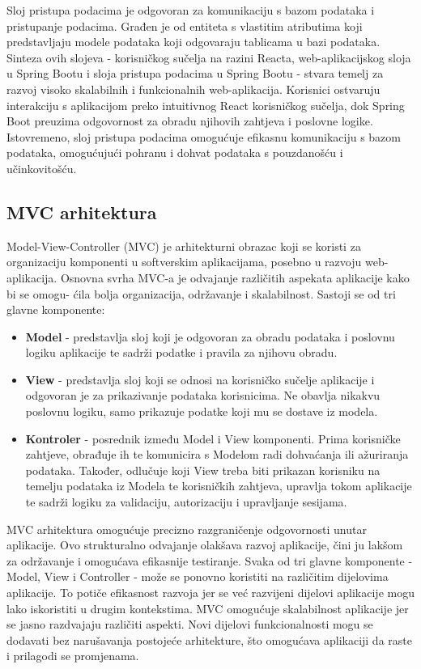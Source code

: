 Sloj pristupa podacima je odgovoran za komunikaciju s bazom podataka i pristupanje podacima. Građen je od entiteta s vlastitim atributima koji predstavljaju modele podataka koji odgovaraju tablicama u bazi podataka.
\newline
Sinteza ovih slojeva - korisničkog sučelja na razini Reacta, web-aplikacijskog sloja u Spring Bootu i sloja pristupa podacima u Spring Bootu - stvara temelj za razvoj visoko skalabilnih i funkcionalnih web-aplikacija. Korisnici ostvaruju interakciju s aplikacijom preko intuitivnog React korisničkog sučelja, dok Spring Boot preuzima odgovornost za obradu njihovih zahtjeva i poslovne logike. Istovremeno, sloj pristupa podacima omogućuje efikasnu komunikaciju s bazom podataka, omogućujući pohranu i dohvat podataka s pouzdanošću i učinkovitošću.
\newline
\subsection{MVC arhitektura}
Model-View-Controller (MVC) je arhitekturni obrazac koji se koristi za organizaciju komponenti u softverskim aplikacijama, posebno u razvoju web-aplikacija. Osnovna svrha MVC-a je odvajanje različitih aspekata aplikacije kako bi se omogu- ćila bolja organizacija, održavanje i skalabilnost. Sastoji se od tri glavne komponente:
\begin{itemize}
	\item\textbf{Model} - predstavlja sloj koji je odgovoran za obradu podataka i poslovnu logiku aplikacije te sadrži podatke i pravila za njihovu obradu.
	\item\textbf{View} - predstavlja sloj koji se odnosi na korisničko sučelje aplikacije i odgovoran je za prikazivanje podataka korisnicima. Ne obavlja nikakvu poslovnu logiku, samo prikazuje podatke koji mu se dostave iz modela.
	\item\textbf{Kontroler} - posrednik između Model i View komponenti. Prima korisničke zahtjeve, obrađuje ih te komunicira s Modelom radi dohvaćanja ili ažuriranja podataka. Također, odlučuje koji View treba biti prikazan korisniku na temelju podataka iz Modela te korisničkih zahtjeva, upravlja tokom aplikacije te sadrži logiku za validaciju, autorizaciju i upravljanje sesijama.
\end{itemize}

MVC arhitektura omogućuje precizno razgraničenje odgovornosti unutar aplikacije. Ovo strukturalno odvajanje olakšava razvoj aplikacije, čini ju lakšom za održavanje i omogućava efikasnije testiranje. Svaka od tri glavne komponente - Model, View i Controller - može se ponovno koristiti na različitim dijelovima aplikacije. To potiče efikasnost razvoja jer se već razvijeni dijelovi aplikacije mogu lako iskoristiti u drugim kontekstima. MVC omogućuje skalabilnost aplikacije jer se jasno razdvajaju različiti aspekti. Novi dijelovi funkcionalnosti mogu se dodavati bez narušavanja postojeće arhitekture, što omogućava aplikaciji da raste i prilagodi se promjenama.

